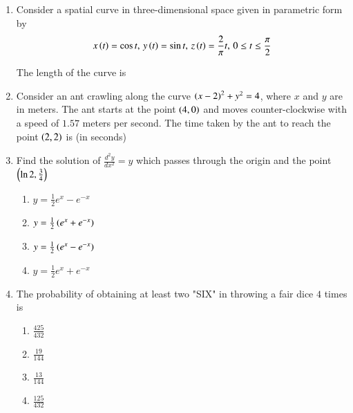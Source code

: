 \documentclass[journal,9pt,onecolumn]{IEEEtran}
\begin{document}
\begin{enumerate}
\item Consider a spatial curve in three-dimensional space given in parametric form by$$
x\left(t\right) = \cos t, \, y\left(t\right) = \sin t, \, z\left(t\right) = \frac{2}{\pi}t, \, 0 \leq t \leq \frac{\pi}{2}
$$

The length of the curve is

\item Consider an ant crawling along the curve $\left(x - 2\right)^2 + y^2 = 4$, where $x$ and $y$ are in meters. The ant starts at the point $\left(4, 0\right)$ and moves counter-clockwise with a speed of $1.57$ meters per second. The time taken by the ant to reach the point $\left(2, 2\right)$ is (in seconds)



\item Find the solution of $\frac{d^2 y}{dx^2} = y$ which passes through the origin and the point $\left(\ln 2, \frac{3}{4}\right)$

\begin{multicols}{4}
\begin{enumerate}
    \item $y = \frac{1}{2} e^x - e^{-x}$
    \item $y = \frac{1}{2}\left(e^x + e^{-x}\right)$
    \item $y = \frac{1}{2}\left(e^x - e^{-x}\right)$
    \item $y = \frac{1}{2} e^x + e^{-x}$
\end{enumerate}
\end{multicols}



    
\item The probability of obtaining at least two "SIX" in throwing a fair dice $4$ times is
\begin{multicols}{4}
\begin{enumerate}
    \item $\frac{425}{432}$
    \item $\frac{19}{144}$
    \item $\frac{13}{144}$
    \item $\frac{125}{432}$
\end{enumerate}
\end{multicols}
\end{enumerate}
\end{document}
